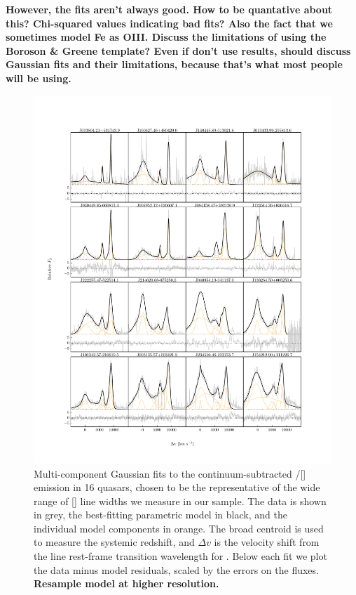 {\bf However, the fits aren't always good. How to be quantative about this? Chi-squared values indicating bad fits? Also the fact that we sometimes model Fe as OIII. Discuss the limitations of using the Boroson \& Greene template? Even if don't use results, should discuss Gaussian fits and their limitations, because that's what most people will be using.}

\begin{figure}
    \includegraphics[width=2\columnwidth]{figures/chapter04/example_spectrum_grid.pdf} 
    \caption{Multi-component Gaussian fits to the continuum-subtracted \hbns/[] emission in 16 quasars, chosen to be the representative of the wide range of [] line widths we measure in our sample. The data is shown in grey, the best-fitting parametric model in black, and the individual model components in orange. The broad \hb centroid is used to measure the systemic redshift, and $\Delta{v}$ is the velocity shift from the line rest-frame transition wavelength for \hbns. Below each fit we plot the data minus model residuals, scaled by the errors on the fluxes. {\bf Resample model at higher resolution.}}     
    \label{fig:example_spectrum_grid}
\end{figure}


